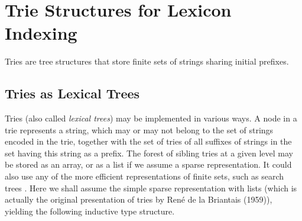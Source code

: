 \section{Trie Structures for Lexicon Indexing}

Tries are tree structures that store finite sets of strings sharing
initial prefixes. 

\subsection{Tries as Lexical Trees}

Tries (also called {\sl lexical trees})
may be implemented in various ways. A node in a trie represents a
string, which may or may not belong to the set of strings encoded in the
trie, together
with the set of tries of all suffixes of strings in the set having this 
string as a prefix. The forest of sibling tries at a given level 
may be stored as an array, or as a list if we assume a sparse representation. 
It could also use any of the more efficient representations of finite sets,
such as search trees \cite{bentley}.
Here we shall assume the simple sparse representation with 
lists (which is actually the original presentation of tries
by Ren\'e de la Briantais (1959)), 
yielding the following inductive type structure.

